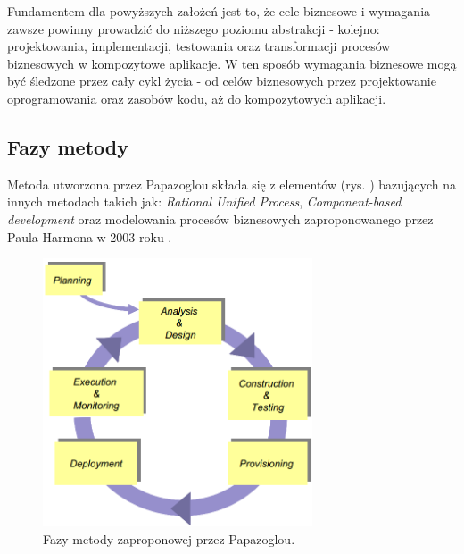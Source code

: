 Fundamentem dla powyższych założeń jest to, że cele biznesowe i wymagania zawsze powinny prowadzić do niższego poziomu abstrakcji - kolejno: projektowania, implementacji, testowania oraz transformacji procesów biznesowych w kompozytowe aplikacje. W ten sposób wymagania biznesowe mogą 
być śledzone przez cały cykl życia - od celów biznesowych przez projektowanie oprogramowania oraz zasobów kodu, aż do kompozytowych aplikacji.

\subsection{Fazy metody}
Metoda utworzona przez Papazoglou składa się z elementów (rys. ) bazujących na innych metodach takich jak: \emph{Rational Unified Process}, \emph{Component-based development} oraz modelowania procesów biznesowych zaproponowanego przez Paula Harmona w 2003 roku \cite{PapaZog}. 

\begin{figure}[h!tbp]
\begin{centering}
\includegraphics[width=8cm]{img/papazoglou_metoda_fazy.png}
\caption[Fazy metody zaproponowej przez Papazoglou.]{Fazy metody zaproponowej przez Papazoglou. \cite{PapaZog}}\label{papazoglou_method_phases}
\end{centering}
\end{figure} 

